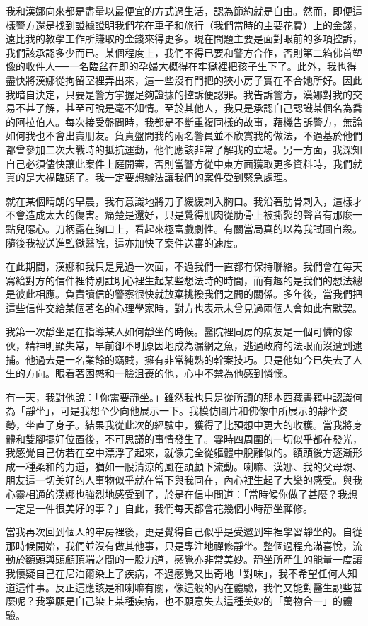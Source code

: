 我和漢娜向來都是盡量以最便宜的方式過生活，認為節約就是自由。然而，即便這樣警方還是找到證據證明我們花在車子和旅行（我們當時的主要花費）上的金錢，遠比我的教學工作所賺取的金錢來得更多。現在問題主要是面對眼前的多項控訴，我們該承認多少而已。某個程度上，我們不得已要和警方合作，否則第二箱佛首塑像的收件人──一名臨盆在即的孕婦大概得在牢獄裡把孩子生下了。此外，我也得盡快將漢娜從拘留室裡弄出來，這一些沒有門把的狹小房子實在不合她所好。因此我暗自決定，只要是警方掌握足夠證據的控訴便認罪。我告訴警方，漢娜對我的交易不甚了解，甚至可說是毫不知情。至於其他人，我只是承認自己認識某個名為喬的阿拉伯人。每次接受盤問時，我都是不斷重複同樣的故事，藉機告訴警方，無論如何我也不會出賣朋友。負責盤問我的兩名警員並不欣賞我的做法，不過基於他們都曾參加二次大戰時的抵抗運動，他們應該非常了解我的立場。另一方面，我深知自己必須儘快讓此案件上庭開審，否則當警方從中東方面獲取更多資料時，我們就真的是大禍臨頭了。我一定要想辦法讓我們的案件受到緊急處理。

就在某個晴朗的早晨，我有意識地將刀子緩緩刺入胸口。我沿著肋骨刺入，這樣才不會造成太大的傷害。痛楚是還好，只是覺得肌肉從肋骨上被撕裂的聲音有那麼一點兒噁心。刀柄露在胸口上，看起來極富戲劇性。有關當局真的以為我試圖自殺。隨後我被送進監獄醫院，這亦加快了案件送審的速度。

在此期間，漢娜和我只是見過一次面，不過我們一直都有保持聯絡。我們會在每天寫給對方的信件裡特別註明心裡生起某些想法時的時間，而有趣的是我們的想法總是彼此相應。負責讀信的警察很快就放棄挑撥我們之間的關係。多年後，當我們把這些信件交給某個著名的心理學家時，對方也表示未曾見過兩個人會如此有默契。

我第一次靜坐是在指導某人如何靜坐的時候。醫院裡同房的病友是一個可憐的傢伙，精神明顯失常，早前卻不明原因地成為漏網之魚，逃過政府的法眼而沒遭到逮捕。他過去是一名業餘的竊賊，擁有非常純熟的幹案技巧。只是他如今已失去了人生的方向。眼看著困惑和一臉沮喪的他，心中不禁為他感到憐憫。

有一天，我對他說：「你需要靜坐。」雖然我也只是從所讀的那本西藏書籍中認識何為「靜坐」，可是我想至少向他展示一下。我模仿圖片和佛像中所展示的靜坐姿勢，坐直了身子。結果我從此次的經驗中，獲得了比預想中更大的收穫。當我將身體和雙腳擺好位置後，不可思議的事情發生了。霎時四周圍的一切似乎都在發光，我感覺自己仿若在空中漂浮了起來，就像完全從軀體中脫離似的。額頭後方逐漸形成一種柔和的力道，猶如一股清涼的風在頭顱下流動。喇嘛、漢娜、我的父母親、朋友這一切美好的人事物似乎就在當下與我同在，內心裡生起了大樂的感受。與我心靈相通的漢娜也強烈地感受到了，於是在信中問道：「當時候你做了甚麼？我想一定是一件很美好的事？」自此，我們每天都會花幾個小時靜坐禪修。

當我再次回到個人的牢房裡後，更是覺得自己似乎是受邀到牢裡學習靜坐的。自從那時候開始，我們並沒有做其他事，只是專注地禪修靜坐。整個過程充滿喜悅，流動於額頭與頭顱頂端之間的一股力道，感覺亦非常美妙。靜坐所產生的能量一度讓我懷疑自己在尼泊爾染上了疾病，不過感覺又出奇地「對味」，我不希望任何人知道這件事。反正這應該是和喇嘛有關，像這般的內在體驗，我們又能對醫生說些甚麼呢？我寧願是自己染上某種疾病，也不願意失去這種美妙的「萬物合一」的體驗。

